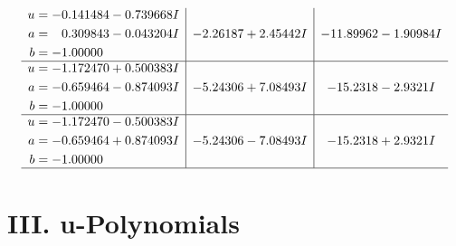 \documentclass[1p]{elsarticle_modified}
\theoremstyle{definition}
\begin{document}
$$\begin{array}{c|c|c}
\begin{aligned}
u &= -0.141484 - 0.739668 I \\
a &= \phantom{-}0.309843 - 0.043204 I \\
b &= -1.00000\phantom{ +0.000000I}\end{aligned}
 & -2.26187 + 2.45442 I & -11.89962 - 1.90984 I \\ \hline\begin{aligned}
u &= -1.172470 + 0.500383 I \\
a &= -0.659464 - 0.874093 I \\
b &= -1.00000\phantom{ +0.000000I}\end{aligned}
 & -5.24306 + 7.08493 I & -15.2318 - 2.9321 I \\ \hline\begin{aligned}
u &= -1.172470 - 0.500383 I \\
a &= -0.659464 + 0.874093 I \\
b &= -1.00000\phantom{ +0.000000I}\end{aligned}
 & -5.24306 - 7.08493 I & -15.2318 + 2.9321 I\\
 \hline 
 \end{array}$$\newpage
\newpage\renewcommand{\arraystretch}{1}
\centering \section*{ III. u-Polynomials}
\end{document}
